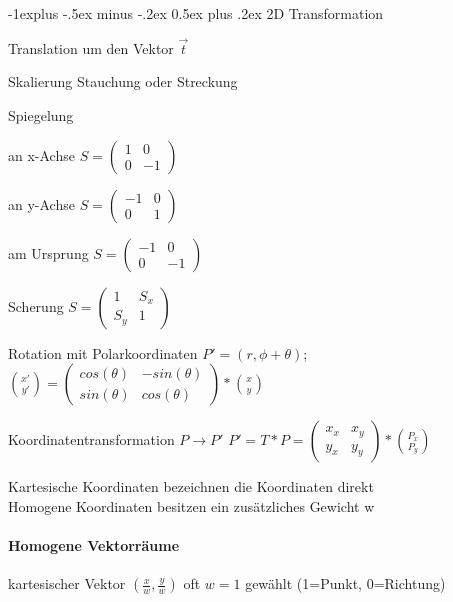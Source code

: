 \documentclass[landscape]{article}
\makeatletter
\renewcommand{\subsection}{\@startsection{subsection}{2}{0mm}%
                                {-1explus -.5ex minus -.2ex}%
                                {0.5ex plus .2ex}%
                                {\normalfont\normalsize\bfseries}}
\makeatother
\begin{document}
\begin{multicols}{3}
  \subsection{2D Transformation}
  \begin{description*}
    \item[Translation] um den Vektor $\vec{t}$
    \item[Skalierung] Stauchung oder Streckung
    \item[Spiegelung]
    \begin{itemize*}
      \item an x-Achse $S=\begin{pmatrix} 1 & 0 \\ 0 & -1 \end{pmatrix}$
      \item an y-Achse $S=\begin{pmatrix} -1 & 0 \\ 0 & 1 \end{pmatrix}$
      \item am Ursprung $S=\begin{pmatrix} -1 & 0 \\ 0 & -1 \end{pmatrix}$
    \end{itemize*}
    \item[Scherung] $S=\begin{pmatrix} 1 & S_x \\ S_y & 1 \end{pmatrix}$
    \item[Rotation mit Polarkoordinaten] $P'=(r,\phi+\theta)$; $\binom{x'}{y'}=\begin{pmatrix} cos(\theta) & -sin(\theta) \\ sin(\theta) & cos(\theta)\end{pmatrix}*\binom{x}{y}$
    \item[Koordinatentransformation] $P\rightarrow P'$ \newline $P' =T*P = \begin{pmatrix} x_x & x_y\\ y_x & y_y \end{pmatrix} * \binom{P_x}{P_y}$
  \end{description*}
  
  Kartesische Koordinaten bezeichnen die Koordinaten direkt\\
  Homogene Koordinaten besitzen ein zusätzliches Gewicht w
  
  \paragraph{Homogene Vektorräume}
  kartesischer Vektor $(\frac{x}{w},\frac{y}{w})$ oft $w=1$ gewählt (1=Punkt, 0=Richtung)
  

\end{multicols}
\end{document}
